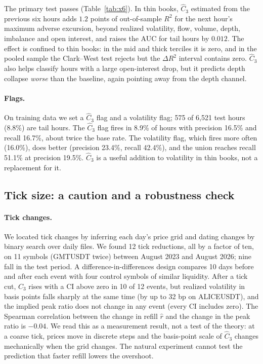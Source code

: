 \documentclass[12pt]{article}
\theoremstyle{definition}
\theoremstyle{remark}
\begin{document}
The primary test passes (Table~\ref{tab:x6}). In thin books, $\hat C_3$ estimated from the previous six hours adds $1.2$ points of out-of-sample $R^2$ for the next hour's maximum adverse excursion, beyond realized volatility, flow, volume, depth, imbalance and open interest, and raises the AUC for tail hours by $0.012$. The effect is confined to thin books: in the mid and thick terciles it is zero, and in the pooled sample the Clark--West test rejects but the $\Delta R^2$ interval contains zero. $\hat C_3$ also helps classify hours with a large open-interest drop, but it predicts depth collapse \emph{worse} than the baseline, again pointing away from the depth channel.

\paragraph{Flags.} On training data we set a $\hat C_3$ flag and a volatility flag; 575 of 6{,}521 test hours (8.8\%) are tail hours. The $\hat C_3$ flag fires in 8.9\% of hours with precision 16.5\% and recall 16.7\%, about twice the base rate. The volatility flag, which fires more often (16.0\%), does better (precision 23.4\%, recall 42.4\%), and the union reaches recall 51.1\% at precision 19.5\%. $\hat C_3$ is a useful addition to volatility in thin books, not a replacement for it.

\subsection{Tick size: a caution and a robustness check}\label{sec:tick}

\paragraph{Tick changes.} We located tick changes by inferring each day's price grid and dating changes by binary search over daily files. We found 12 tick reductions, all by a factor of ten, on 11 symbols (GMTUSDT twice) between August 2023 and August 2026; nine fall in the test period. A difference-in-differences design compares 10 days before and after each event with four control symbols of similar liquidity. After a tick cut, $\hat C_3$ rises with a CI above zero in 10 of 12 events, but realized volatility in basis points falls sharply at the same time (by up to 32 bp on ALICEUSDT), and the implied peak ratio does not change in any event (every CI includes zero). The Spearman correlation between the change in refill $\hat r$ and the change in the peak ratio is $-0.04$. We read this as a measurement result, not a test of the theory: at a coarse tick, prices move in discrete steps and the basis-point scale of $\hat C_3$ changes mechanically when the grid changes. The natural experiment cannot test the prediction that faster refill lowers the overshoot.
\end{document}
